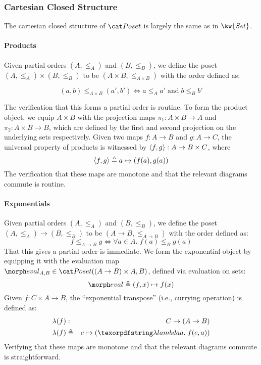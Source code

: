

\subsubsection{Cartesian Closed Structure}

The cartesian closed structure of $\Poset$ is largely the
same as in $\kw{Set}$.

\paragraph{Products} Given  partial orders $(A, \leq_A)$ and $(B, \leq_B)$,
we define the poset $(A , \leq_A) \times (B, \leq_B)$ to be
$(A \times B, \leq_{A \times B})$ with the order defined as:

\begin{displaymath}
  (a,b) \leq_{A \times B} (a', b') \iff a \leq_A a' \;\mbox{and}\; b \leq_B b'
\end{displaymath}

The verification that this forms a partial order is routine. To
form the product object, we equip $A \times B$ with the projection
maps $\pi_1 : A \times B \to A$ and $\pi_2 : A \times B \to B$, which are
defined by the first and second projection on the underlying sets
respectively.
%
Given two maps $f : A \to B$ and $g : A \to C$, the universal property
of products is witnessed by $\langle{f,g}\rangle : A \to B \times C$, where
\begin{displaymath}
  \langle{f, g}\rangle \triangleq a \mapsto ({f(a), g(a)})
\end{displaymath}
%
The verification that these maps are monotone and that the relevant
diagrams commute is routine.

\paragraph{Exponentials} Given partial orders $(A, \leq_A)$ and $(B, \leq_B)$,
we define the poset $(A , \leq_A) \to (B, \leq_B)$ to be $(A \to B, \leq_{A \to B})$
with the order defined as:
%
\begin{displaymath}
  f \leq_{A \to B} g \iff \forall a \in A.\; f(a) \leq_B g(a)
\end{displaymath}
That this gives a partial order is immediate. We form the exponential object by
equipping it with the evaluation map $\eval_{A,B} \in \Poset((A \to B) \times A, B)$,
defined via evaluation on sets:
\begin{displaymath}
  \eval \triangleq (f,x) \mapsto f(x)
\end{displaymath}
%
Given $f : C \times A \to B$, the ``exponential transpose'' (i.e., currying
operation) is defined as:
\begin{eqnarray*}
  \lambda(f) & : & C \to (A \to B) \\
  \lambda(f) & \triangleq & c \mapsto (\fnof{a} f(c,a))
\end{eqnarray*}
Verifying that these maps are monotone and that the relevant
diagrams commute is straightforward.

